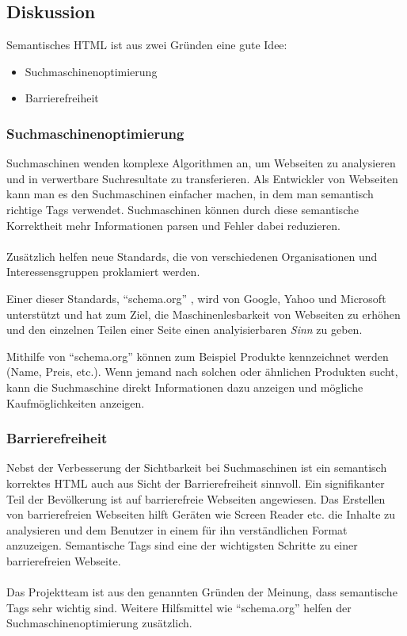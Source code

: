 \subsection*{Diskussion}
Semantisches HTML ist aus zwei Gründen eine gute Idee:
\begin{itemize}
	\item Suchmaschinenoptimierung
	\item Barrierefreiheit
\end{itemize}

\subsubsection*{Suchmaschinenoptimierung}
Suchmaschinen wenden komplexe Algorithmen an, um Webseiten zu analysieren und in verwertbare Suchresultate zu transferieren. Als Entwickler von Webseiten kann man es den Suchmaschinen einfacher machen, in dem man semantisch richtige Tags verwendet.
Suchmaschinen können durch diese semantische Korrektheit mehr Informationen parsen und Fehler dabei reduzieren.
\\ \\
Zusätzlich helfen neue Standards, die von verschiedenen Organisationen und Interessensgruppen proklamiert werden.

Einer dieser Standards, ``schema.org'' \cite{SchemaOrg}, wird von Google, Yahoo und Microsoft unterstützt und hat zum Ziel, die Maschinenlesbarkeit von Webseiten zu erhöhen und den einzelnen Teilen einer Seite einen analyisierbaren \emph{Sinn} zu geben.

Mithilfe von ``schema.org'' können zum Beispiel Produkte kennzeichnet werden (Name, Preis, etc.). Wenn jemand nach solchen oder ähnlichen Produkten sucht, kann die Suchmaschine direkt Informationen dazu anzeigen und mögliche Kaufmöglichkeiten anzeigen.

\subsubsection*{Barrierefreiheit}
Nebst der Verbesserung der Sichtbarkeit bei Suchmaschinen ist ein semantisch korrektes HTML auch aus Sicht der Barrierefreiheit sinnvoll. Ein signifikanter Teil der Bevölkerung ist auf barrierefreie Webseiten angewiesen. Das Erstellen von barrierefreien Webseiten hilft Geräten wie Screen Reader etc. die Inhalte zu analysieren und dem Benutzer in einem für ihn verständlichen Format anzuzeigen.
Semantische Tags sind eine der wichtigsten Schritte zu einer barrierefreien Webseite.
\\ \\
Das Projektteam ist aus den genannten Gründen der Meinung, dass semantische Tags sehr wichtig sind. Weitere Hilfsmittel wie ``schema.org'' \cite{SchemaOrg} helfen der Suchmaschinenoptimierung zusätzlich.